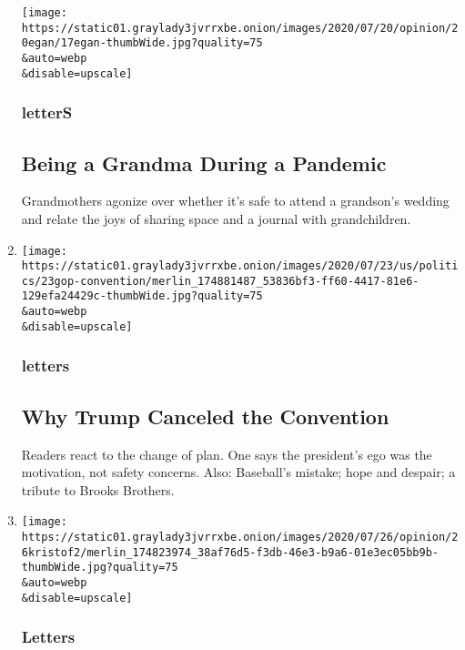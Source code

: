 \begin{enumerate}
  \texttt{[image: https://static01.graylady3jvrrxbe.onion/images/2020/07/20/opinion/20egan/17egan-thumbWide.jpg?quality=75\\\&auto=webp\\\&disable=upscale]}

  \hypertarget{letters-7}{%
  \subsubsection{letterS}\label{letters-7}}

  \hypertarget{being-a-grandma-during-a-pandemic}{%
  \subsection{Being a Grandma During a
  Pandemic}\label{being-a-grandma-during-a-pandemic}}

  Grandmothers agonize over whether it's safe to attend a grandson's
  wedding and relate the joys of sharing space and a journal with
  grandchildren.
\item
  \href{/2020/07/28/opinion/letters/trump-convention.html}{}

  \texttt{[image: https://static01.graylady3jvrrxbe.onion/images/2020/07/23/us/politics/23gop-convention/merlin\_174881487\_53836bf3-ff60-4417-81e6-129efa24429c-thumbWide.jpg?quality=75\\\&auto=webp\\\&disable=upscale]}

  \hypertarget{letters-8}{%
  \subsubsection{letters}\label{letters-8}}

  \hypertarget{why-trump-canceled-the-convention}{%
  \subsection{Why Trump Canceled the
  Convention}\label{why-trump-canceled-the-convention}}

  Readers react to the change of plan. One says the president's ego was
  the motivation, not safety concerns. Also: Baseball's mistake; hope
  and despair; a tribute to Brooks Brothers.
\item
  \href{/2020/07/27/opinion/letters/protests-portland.html}{}

  \texttt{[image: https://static01.graylady3jvrrxbe.onion/images/2020/07/26/opinion/26kristof2/merlin\_174823974\_38af76d5-f3db-46e3-b9a6-01e3ec05bb9b-thumbWide.jpg?quality=75\\\&auto=webp\\\&disable=upscale]}

  \hypertarget{letters-9}{%
  \subsubsection{Letters}\label{letters-9}}


\end{enumerate}
